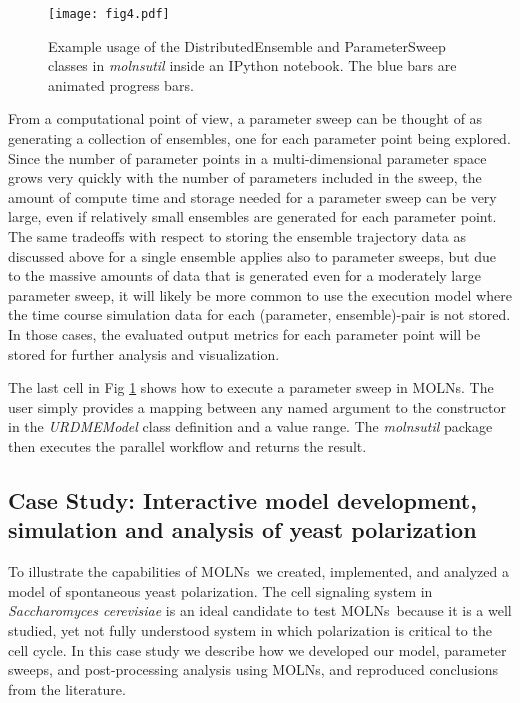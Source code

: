 \documentclass[final,leqno,onefignum,onetabnum]{siamltex1213}
\def\packagename {MOLNs}
\begin{document}
\begin{figure}[htpb]
\begin{center}
\texttt{[image: fig4.pdf]}
\end{center}
\caption{Example usage of the DistributedEnsemble and ParameterSweep classes in \emph{molnsutil} inside an IPython notebook.  The blue bars are animated progress bars. }
\label{fig:distributedensemble}
\end{figure}

From a computational point of view, a parameter sweep can be thought of as generating a collection of ensembles, one for each parameter point being explored. Since the number of parameter points in a multi-dimensional parameter space grows very quickly with the number of parameters included in the sweep, the amount of compute time and storage needed for a parameter sweep can be very large, even if relatively small ensembles are generated for each parameter point. The same tradeoffs with respect to storing the ensemble trajectory data as discussed above for a single ensemble applies also to parameter sweeps, but due to the massive amounts of data that is generated even for a moderately large parameter sweep, it will likely be more common to use the execution model where the time course simulation data for each (parameter, ensemble)-pair is not stored. In those cases, the evaluated output metrics for each parameter point will be stored for further analysis and visualization.  

The last cell in Fig \ref{fig:distributedensemble} shows how to execute a parameter sweep in \packagename.  The user simply provides a mapping between any named argument to the constructor in the \emph{URDMEModel} class definition and a value range. The \emph{molnsutil} package then executes the parallel workflow and returns the result. 



\subsection{Case Study: Interactive model development, simulation and analysis of yeast polarization}
\label{sec:CaseStudy}

To illustrate the capabilities of \packagename~we created, implemented, and analyzed a model of spontaneous yeast polarization. The cell signaling system in \emph{Saccharomyces cerevisiae} is an ideal candidate to test \packagename~because it is a well studied, yet not fully understood system in which polarization is critical to the cell cycle. In this case study we describe how we developed our model, parameter sweeps, and post-processing analysis using \packagename, and reproduced conclusions from the literature. 
\end{document}
